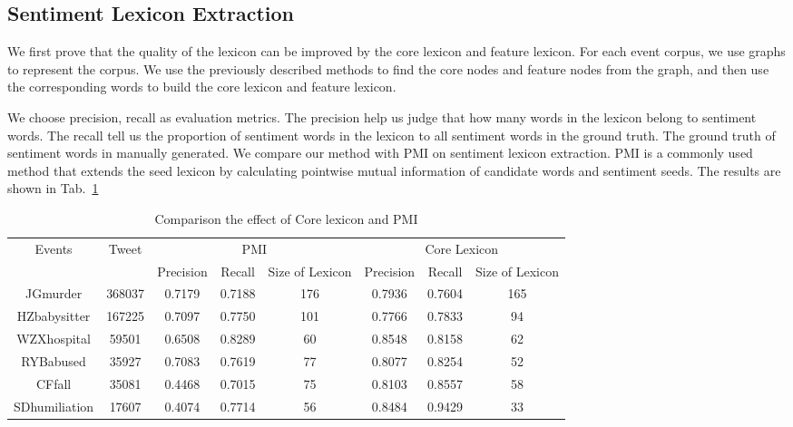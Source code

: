 \documentclass[runningheads]{llncs}
\begin{document}
\subsection{Sentiment Lexicon Extraction}
We first prove that the quality of the lexicon can be improved by the core lexicon and feature lexicon. For each event corpus, we use graphs to represent the corpus. We use the previously described methods to find the core nodes and feature nodes from the graph, and then use the corresponding words to build the core lexicon and feature lexicon.

We choose precision, recall as evaluation metrics. The precision help us judge that how many words in the lexicon belong to sentiment words. The recall tell us the proportion of sentiment words in the lexicon to all sentiment words in the ground truth. The ground truth of sentiment words in manually generated. We compare our method with PMI on sentiment lexicon extraction. PMI is a commonly used method that extends the seed lexicon by calculating pointwise mutual information of candidate words and sentiment seeds. The results are shown in Tab.~\ref{table:core lexicon}

\begin{table}[ht]
\caption{Comparison the effect of Core lexicon and PMI}\label{table:core lexicon}
\begin{center}
\begin{tabular}{|c|c|c|c|c|c|c|c|}
\hline
\multirow{2}{*}{Events} & \multirow{2}{*}{Tweet} & \multicolumn{3}{c|}{PMI}             & \multicolumn{3}{c|}{Core Lexicon}    \\ 
\cline{3-8}                         &                        & Precision & Recall & Size of Lexicon & Precision & Recall & Size of Lexicon \\ \hline
JGmurder                & 368037                 & 0.7179    & 0.7188 & 176             & 0.7936    & 0.7604 & 165             \\ \hline
HZbabysitter            & 167225                 & 0.7097    & 0.7750 & 101             & 0.7766    & 0.7833 & 94              \\ \hline
WZXhospital             & 59501                  & 0.6508    & 0.8289 & 60              & 0.8548    & 0.8158 & 62              \\ \hline
RYBabused               & 35927                  & 0.7083    & 0.7619 & 77              & 0.8077    & 0.8254 & 52              \\ \hline
CFfall                  & 35081                  & 0.4468    & 0.7015 & 75              & 0.8103    & 0.8557 & 58              \\ \hline
SDhumiliation           & 17607                  & 0.4074    & 0.7714 & 56              & 0.8484    & 0.9429 & 33              \\ \hline
\end{tabular}
\end{center}
\end{table}
\end{document}
